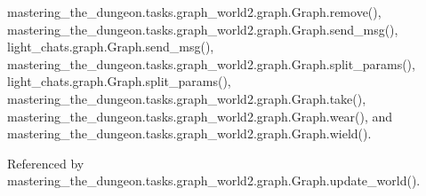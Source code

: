 mastering\+\_\+the\+\_\+dungeon.\+tasks.\+graph\+\_\+world2.\+graph.\+Graph.\+remove(), mastering\+\_\+the\+\_\+dungeon.\+tasks.\+graph\+\_\+world2.\+graph.\+Graph.\+send\+\_\+msg(), light\+\_\+chats.\+graph.\+Graph.\+send\+\_\+msg(), mastering\+\_\+the\+\_\+dungeon.\+tasks.\+graph\+\_\+world2.\+graph.\+Graph.\+split\+\_\+params(), light\+\_\+chats.\+graph.\+Graph.\+split\+\_\+params(), mastering\+\_\+the\+\_\+dungeon.\+tasks.\+graph\+\_\+world2.\+graph.\+Graph.\+take(), mastering\+\_\+the\+\_\+dungeon.\+tasks.\+graph\+\_\+world2.\+graph.\+Graph.\+wear(), and mastering\+\_\+the\+\_\+dungeon.\+tasks.\+graph\+\_\+world2.\+graph.\+Graph.\+wield().



Referenced by mastering\+\_\+the\+\_\+dungeon.\+tasks.\+graph\+\_\+world2.\+graph.\+Graph.\+update\+\_\+world().

